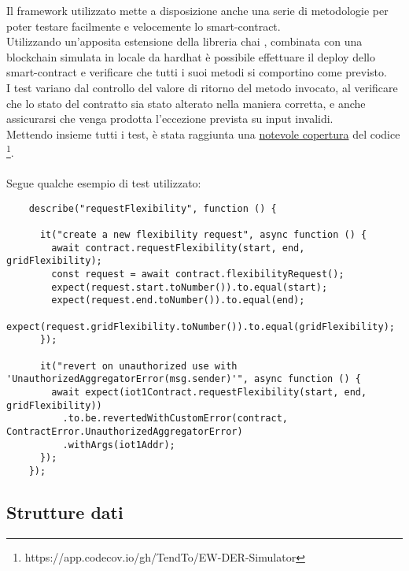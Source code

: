 Il framework utilizzato mette a disposizione anche una serie di metodologie per poter testare facilmente e velocemente lo \gls{smart-contract}. \\
Utilizzando un'apposita estensione della libreria chai \cite{soft:chai}, combinata con una blockchain simulata in locale da hardhat
è possibile effettuare il deploy dello \gls{smart-contract} e verificare che tutti i suoi metodi si comportino come previsto. \\
I test variano dal controllo del valore di ritorno del metodo invocato, al verificare che lo stato del contratto sia stato alterato nella maniera corretta,
e anche assicurarsi che venga prodotta l'eccezione prevista su input invalidi. \\
Mettendo insieme tutti i test, è stata raggiunta una \href{https://app.codecov.io/gh/TendTo/EW-DER-Simulator}{notevole copertura} del codice \footnote{https://app.codecov.io/gh/TendTo/EW-DER-Simulator}. \\
\\
Segue qualche esempio di test utilizzato:
\begin{verbatim}
    describe("requestFlexibility", function () {

      it("create a new flexibility request", async function () {
        await contract.requestFlexibility(start, end, gridFlexibility);
        const request = await contract.flexibilityRequest();
        expect(request.start.toNumber()).to.equal(start);
        expect(request.end.toNumber()).to.equal(end);
        expect(request.gridFlexibility.toNumber()).to.equal(gridFlexibility);
      });

      it("revert on unauthorized use with 'UnauthorizedAggregatorError(msg.sender)'", async function () {
        await expect(iot1Contract.requestFlexibility(start, end, gridFlexibility))
          .to.be.revertedWithCustomError(contract, ContractError.UnauthorizedAggregatorError)
          .withArgs(iot1Addr);
      });
    });
\end{verbatim}

\subsection{Strutture dati}


